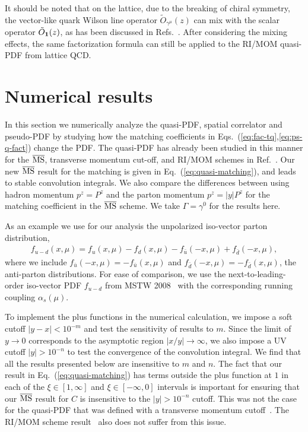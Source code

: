 \documentclass[prd,aps,twocolumn,preprintnumbers,showpacs,nofootinbib,superscriptaddress,notitlepage]{revtex4-1}
\newcommand{\spcorr}{spatial correlator\xspace}
\DeclareRobustCommand{\eq}[1]{Eq.~(\ref{eq:#1})}
\begin{document}
It should be noted that on the lattice, due to the breaking of chiral symmetry, the vector-like quark Wilson line operator $\tilde{O}_{\gamma^\mu}(z)$ can mix with the scalar operator $\tilde{O}_{\bf 1}(z)$, as has been discussed in Refs.~\cite{Constantinou:2017sej,Alexandrou:2017huk,Chen:2017mzz,Green:2017xeu,Chen:2017mie}. After considering the mixing effects, the same factorization formula can still be applied to the RI/MOM quasi-PDF from lattice QCD.






\section{Numerical results}
\label{sec:num}

In this section we numerically analyze the quasi-PDF, \spcorr and pseudo-PDF by studying how the matching coefficients in Eqs.~(\ref{eq:fac-tq},\ref{eq:ps-q-fact}) change the PDF. The quasi-PDF has already been studied in this manner for the $\overline{\rm MS}$, transverse momentum cut-off, and RI/MOM schemes in Ref.~\cite{Stewart:2017tvs}. Our  new $\overline{\rm MS}$ result for the matching is given in \eq{quasi-matching}, and leads to stable convolution integrals.  We also compare the differences between using hadron momentum $p^z=P^z$ and the parton momentum $p^z=|y|P^z$ for the matching coefficient in the $\overline{\rm MS}$ scheme. We take $\Gamma =\gamma^0$ for the results here.

As an example we use for our analysis the unpolarized iso-vector parton distribution,
\begin{align}
f_{u-d}(x,\mu) =  f_u(x,\mu) - f_d(x,\mu) - f_{\bar{u}}(-x,\mu) +  f_{\bar{d}}(-x,\mu),
\end{align}
where we include
$f_{\bar{u}}(-x,\mu) = - f_{\bar{u}}(x,\mu)$ and $f_{\bar{d}}(-x,\mu) = - f_{\bar{d}}(x,\mu)$, the anti-parton distributions. For ease of comparison, we use the next-to-leading-order iso-vector PDF $f_{u-d}$ from MSTW 2008~\cite{Martin:2009iq} with the corresponding running coupling $\alpha_s(\mu)$.

To implement the plus functions in the numerical calculation, we impose a soft cutoff $|y-x|<10^{-m}$ and test the sensitivity of results to $m$. Since the limit of $y\to0$ corresponds to the asymptotic region $|x/y|\to\infty$, we also impose a UV cutoff $|y|>10^{-n}$ to test the convergence of the convolution integral. We find that all the results presented below are insensitive to $m$ and $n$. The fact that our result in \eq{quasi-matching} has terms outside the plus function at $1$ in each of the $\xi\in [1,\infty]$ and $\xi\in [-\infty,0]$ intervals is important for ensuring that our $\overline{\rm MS}$ result for $C$ is insensitive to the $|y|>10^{-n}$ cutoff. This was not the case for the quasi-PDF that was defined with a transverse momentum cutoff~\cite{Xiong:2013bka}. The RI/MOM scheme result~\cite{Stewart:2017tvs} also does not suffer from this issue.
\end{document}
